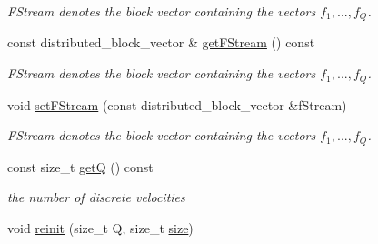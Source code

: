 \begin{DoxyCompactItemize}
\begin{DoxyCompactList}\small\item\em F\-Stream denotes the block vector containing the vectors $ f_1, ..., f_Q $. \end{DoxyCompactList}\item 
\hypertarget{classnatrium_1_1DistributionFunctions_a88224d528262c522ea2ad8bec11178c1}{const distributed\-\_\-block\-\_\-vector \& \hyperlink{classnatrium_1_1DistributionFunctions_a88224d528262c522ea2ad8bec11178c1}{get\-F\-Stream} () const }\label{classnatrium_1_1DistributionFunctions_a88224d528262c522ea2ad8bec11178c1}

\begin{DoxyCompactList}\small\item\em F\-Stream denotes the block vector containing the vectors $ f_1, ..., f_Q $. \end{DoxyCompactList}\item 
\hypertarget{classnatrium_1_1DistributionFunctions_ad0ada0c54968a61f78eb1b82eb6c5a68}{void \hyperlink{classnatrium_1_1DistributionFunctions_ad0ada0c54968a61f78eb1b82eb6c5a68}{set\-F\-Stream} (const distributed\-\_\-block\-\_\-vector \&f\-Stream)}\label{classnatrium_1_1DistributionFunctions_ad0ada0c54968a61f78eb1b82eb6c5a68}

\begin{DoxyCompactList}\small\item\em F\-Stream denotes the block vector containing the vectors $ f_1, ..., f_Q $. \end{DoxyCompactList}\item 
\hypertarget{classnatrium_1_1DistributionFunctions_ae0fd8e8234c7d5abec8522767d2a95e7}{const size\-\_\-t \hyperlink{classnatrium_1_1DistributionFunctions_ae0fd8e8234c7d5abec8522767d2a95e7}{get\-Q} () const }\label{classnatrium_1_1DistributionFunctions_ae0fd8e8234c7d5abec8522767d2a95e7}

\begin{DoxyCompactList}\small\item\em the number of discrete velocities \end{DoxyCompactList}\item 
\hypertarget{classnatrium_1_1DistributionFunctions_acaca68f7cbb9322d354ad6dca68b2cb2}{void \hyperlink{classnatrium_1_1DistributionFunctions_acaca68f7cbb9322d354ad6dca68b2cb2}{reinit} (size\-\_\-t Q, size\-\_\-t \hyperlink{classnatrium_1_1DistributionFunctions_a636814c639143c76989b09b2a92b6757}{size})}\label{classnatrium_1_1DistributionFunctions_acaca68f7cbb9322d354ad6dca68b2cb2}


\end{DoxyCompactItemize}
